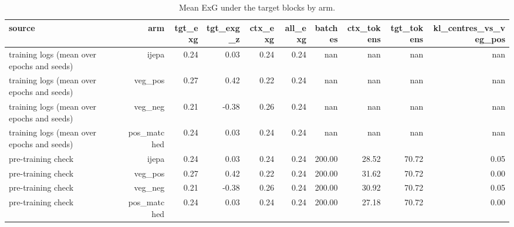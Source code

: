 \begin{table}[t]
\centering
\small
\caption{Mean ExG under the target blocks by arm.}
\label{tab:manipulation_check}
\begin{tabular}{lrrrrrrrrr}
\toprule
source & arm & tgt\_exg & tgt\_exg\_z & ctx\_exg & all\_exg & batches & ctx\_tokens & tgt\_tokens & kl\_centres\_vs\_veg\_pos \\
\midrule
training logs (mean over epochs and seeds) & ijepa & 0.24 & 0.03 & 0.24 & 0.24 & nan & nan & nan & nan \\
training logs (mean over epochs and seeds) & veg\_pos & 0.27 & 0.42 & 0.22 & 0.24 & nan & nan & nan & nan \\
training logs (mean over epochs and seeds) & veg\_neg & 0.21 & -0.38 & 0.26 & 0.24 & nan & nan & nan & nan \\
training logs (mean over epochs and seeds) & pos\_matched & 0.24 & 0.03 & 0.24 & 0.24 & nan & nan & nan & nan \\
pre-training check & ijepa & 0.24 & 0.03 & 0.24 & 0.24 & 200.00 & 28.52 & 70.72 & 0.05 \\
pre-training check & veg\_pos & 0.27 & 0.42 & 0.22 & 0.24 & 200.00 & 31.62 & 70.72 & 0.00 \\
pre-training check & veg\_neg & 0.21 & -0.38 & 0.26 & 0.24 & 200.00 & 30.92 & 70.72 & 0.05 \\
pre-training check & pos\_matched & 0.24 & 0.03 & 0.24 & 0.24 & 200.00 & 27.18 & 70.72 & 0.00 \\
\bottomrule
\end{tabular}
\end{table}
